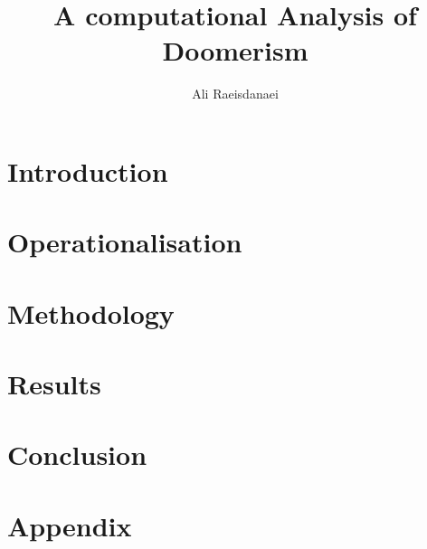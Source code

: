 \documentclass{article}
\begin{document}

\title{A computational Analysis of Doomerism}
\author{Ali Raeisdanaei}
\maketitle

\begin{multicols}{2}
\section{Introduction}


\section{Operationalisation}


\section{Methodology}


\section{Results}


\section{Conclusion}


\end{multicols}

\printbibliography

\section{Appendix}

\end{document}
